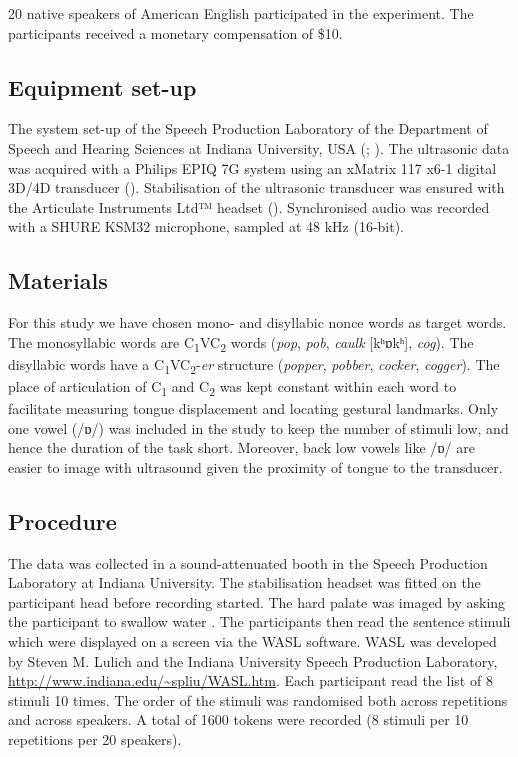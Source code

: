 \documentclass[preprint]{JASAnew}
\begin{document}
20 native speakers of American English participated in the experiment.
The participants received a monetary compensation of \$10.

\subsection{Equipment set-up}\label{equipment-set-up}

The system set-up of the Speech Production Laboratory of the Department
of Speech and Hearing Sciences at Indiana University, USA
(\citet{lulich2017}; \citet{charles2018}). The ultrasonic data was
acquired with a Philips EPIQ 7G system using an xMatrix 117 x6-1 digital
3D/4D transducer (). Stabilisation of the ultrasonic transducer was
ensured with the Articulate Instruments Ltd™ headset
(\citeyear{articulate2008}). Synchronised audio was recorded with a
SHURE KSM32 microphone, sampled at 48 kHz (16-bit).

\subsection{Materials}\label{materials}

For this study we have chosen mono- and disyllabic nonce words as target
words. The monosyllabic words are C\textsubscript{1}VC\textsubscript{2}
words (\emph{pop}, \emph{pob}, \emph{caulk} {[}kʰɒkʰ{]}, \emph{cog}).
The disyllabic words have a
C\textsubscript{1}VC\textsubscript{2}-\emph{er} structure
(\emph{popper}, \emph{pobber}, \emph{cocker}, \emph{cogger}). The place
of articulation of C\textsubscript{1} and C\textsubscript{2} was kept
constant within each word to facilitate measuring tongue displacement
and locating gestural landmarks. Only one vowel (/ɒ/) was included in
the study to keep the number of stimuli low, and hence the duration of
the task short. Moreover, back low vowels like /ɒ/ are easier to image
with ultrasound given the proximity of tongue to the transducer.

\subsection{Procedure}\label{procedure}

The data was collected in a sound-attenuated booth in the Speech
Production Laboratory at Indiana University. The stabilisation headset
was fitted on the participant head before recording started. The hard
palate was imaged by asking the participant to swallow water
\citep{epstein2005}. The participants then read the sentence stimuli
which were displayed on a screen via the WASL software. WASL was
developed by Steven M. Lulich and the Indiana University Speech
Production Laboratory, \url{http://www.indiana.edu/~spliu/WASL.htm}.
Each participant read the list of 8 stimuli 10 times. The order of the
stimuli was randomised both across repetitions and across speakers. A
total of 1600 tokens were recorded (8 stimuli per 10 repetitions per 20
speakers).
\end{document}
